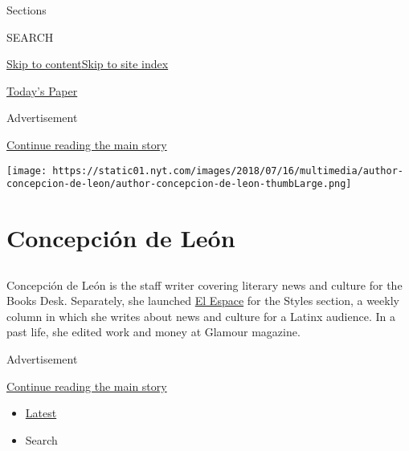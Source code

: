 Sections

SEARCH

\protect\hyperlink{site-content}{Skip to
content}\protect\hyperlink{site-index}{Skip to site index}

\href{https://myaccount.nytimes.com/auth/login?response_type=cookie\&client_id=vi}{}

\href{https://www.nytimes.com/section/todayspaper}{Today's Paper}

Advertisement

\protect\hyperlink{after-top}{Continue reading the main story}

\texttt{[image: https://static01.nyt.com/images/2018/07/16/multimedia/author-concepcion-de-leon/author-concepcion-de-leon-thumbLarge.png]}

\hypertarget{concepciuxf3n-de-leuxf3n}{%
\section{Concepción de León}\label{concepciuxf3n-de-leuxf3n}}

\subsection{}

Concepción de León is the staff writer covering literary news and
culture for the Books Desk. Separately, she launched
\href{https://www.nytimes.com/spotlight/el-espace}{El Espace} for the
Styles section, a weekly column in which she writes about news and
culture for a Latinx audience. In a past life, she edited work and money
at Glamour magazine.

Advertisement

\protect\hyperlink{after-mid1}{Continue reading the main story}

\begin{itemize}
\tightlist
\item
  \protect\hyperlink{stream-panel}{Latest}
\item
  Search
\end{itemize}

